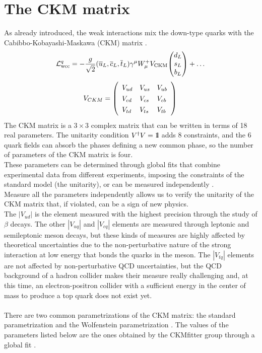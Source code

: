 \section{The CKM matrix}\label{sec:CKM}
As already introduced, the weak interactions mix the down-type quarks with the Cabibbo-Kobayashi-Maskawa (CKM) matrix \cite{Cabibbo_angle,Kobayashi1973CP-ViolationInteraction}.
\begin{equation}
    \Lg{wcc}^q=-\frac{g}{\sqrt{2}}(\overline{{{u}}}_{L},\overline{{{c}}}_{L},\overline{{{t}}}_{L})\gamma^{\mu}W_{\mu}^{+}V_{\mathrm{CKM}}\tb{d_{L}}{s_{L}}{b_L}+\dots
\end{equation}
\begin{equation}
V_{C K M}=\left(\begin{array}{l l l}{{V_{u d}}}&{{V_{u s}}}&{{V_{u b}}}\\ {{V_{c d}}}&{{V_{c s}}}&{{V_{c b}}}\\ {{V_{t d}}}&{{V_{t s}}}&{{V_{t b}}}\end{array}\right)\,
\end{equation}
The CKM matrix is a $3 \times 3$ complex matrix that can be written in terms of 18 real parameters. The unitarity condition $V^\dagger V= 1\kern-0.25em\text{l}$ adds 8 constraints, and the 6 quark fields can absorb the phases defining a new common phase, so the number of parameters of the CKM matrix is four.\\
These parameters can be determined through global fits that combine experimental data from different experiments, imposing the constraints of the standard model (\eg the unitarity), or can be measured independently \cite{PDG_2022}.\\
Measure all the parameters independently allows us to verify the unitarity of the CKM matrix that, if violated, can be a sign of new physics.\\
The $|V_{ud}|$ is the element measured with the highest precision through  the study of $\beta$ decays. The other $|V_{uq}|$ and $|V_{cq}|$ elements are measured through leptonic and semileptonic meson decays, but these kinds of measures are highly affected by theoretical uncertainties due to the non-perturbative nature of the strong interaction at low energy that bonds the quarks in the meson.
The $|V_{tq}|$ elements are not affected by non-perturbative QCD uncertainties, but the QCD background of a hadron collider makes their measure really challenging and, at this time, an electron-positron collider with a sufficient energy in the center of mass to produce a top quark does not exist yet.
\\
\\
There are two common parametrizations of the CKM matrix: the standard parametrization and the Wolfenstein parametrization \cite{PDG_2022}.
The values of the parameters listed below are the ones obtained by the CKMfitter group through a global fit \cite{Charles2005CPFactories,Hocker2001AMatrix,PDG_2022}.
